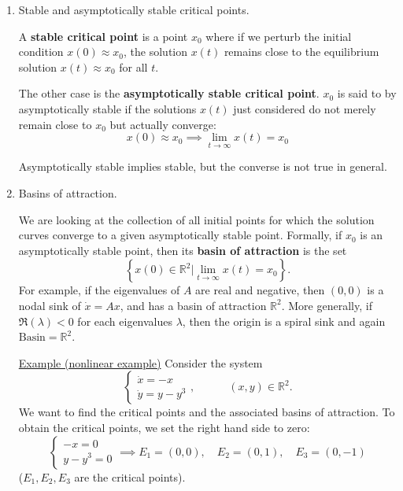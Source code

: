 \documentclass[11pt, letterpaper, oneside]{article}     %
\numberwithin{equation}{subsection}
\theoremstyle{definition}
\numberwithin{theorem}{section}
\theoremstyle{remark}
\newcommand{\RR}{\mathbb{R}}
\begin{document}
\begin{enumerate}
  \medskip

\item Stable and asymptotically stable critical points.

  A \textbf{stable critical point} is a point $x_0$ where if we perturb the initial condition $x(0) \approx x_0$, the solution $x(t)$ remains close to the equilibrium solution $x(t) \approx x_0$ for all $t$.

  The other case is the \textbf{asymptotically stable critical point}. $x_0$ is said to by asymptotically stable if the solutions $x(t)$ just considered do not merely remain close to $x_0$ but actually converge:
  \begin{equation}
    x(0) \approx x_0 \implies \lim_{t\to\infty}x(t) = x_0
  \end{equation}

  Asymptotically stable implies stable, but the converse is not true in general.

  \medskip

\item Basins of attraction.

  We are looking at the collection of all initial points for which the solution curves converge to a given asymptotically stable point. Formally, if $x_0$ is an asymptotically stable point, then its \textbf{basin of attraction} is the set
  \begin{equation}\label{eq:basin-of-attraction}
    \left\{ x(0) \in \RR^2 \big| \lim_{t\to\infty}x(t) = x_0\right\}.
  \end{equation}
  For example, if the eigenvalues of $A$ are real and negative, then $(0,0)$ is a nodal sink of $\dot x = Ax$, and has a basin of attraction $\RR^2$. More generally, if $\Re(\lambda) < 0$ for each eigenvalues $\lambda$, then the origin is a spiral sink and again $\text{Basin} = \RR^2$.

  \underline{Example (nonlinear example)} Consider the system
  \begin{equation}
    \begin{cases}
      \dot x = -x\\
      \dot y = y - y^3
    \end{cases},
    \quad\quad\quad (x,y) \in \RR^2.
  \end{equation}
  We want to find the critical points and the associated basins of attraction. To obtain the critical points, we set the right hand side to zero:
  \begin{equation}
    \begin{cases}
      -x = 0\\
      y - y^3 = 0
    \end{cases}
    \implies E_1 = (0,0),\quad E_2 = (0,1),\quad E_3 = (0, -1)
  \end{equation}
  ($E_1,E_2,E_3$ are the critical points).


\end{enumerate}
\end{document}
